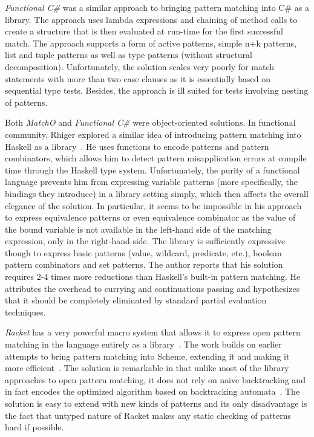 \emph{Functional C\#} was a similar approach to bringing pattern matching into 
C\# as a library\cite{FuncCSharp}. The approach uses lambda expressions and 
chaining of method calls to create a structure that is then evaluated at 
run-time for the first successful match. The approach supports a form of 
active patterns, simple n+k patterns, list and tuple patterns as well as type 
patterns (without structural decomposition). Unfortunately, the solution scales 
very poorly for match statements with more than two case clauses as it is 
essentially based on sequential type tests. Besides, the approach is ill suited 
for tests involving nesting of patterns.

Both \emph{MatchO} and \emph{Functional C\#} were object-oriented solutions. In 
functional community, Rhiger explored a similar idea of introducing pattern 
matching into Haskell as a library~\cite{Rhiger09}. He uses functions to encode 
patterns and pattern combinators, which allows him to detect pattern 
misapplication errors at compile time through the Haskell type system. 
Unfortunately, the purity of a functional language prevents him from expressing 
variable patterns (more specifically, the bindings they introduce) in a library 
setting simply, which then affects the overall elegance of the solution. In 
particular, it seems to be impossible in his approach to express equivalence 
patterns or even equivalence combinator as the value of the bound variable is 
not available in the left-hand side of the matching expression, only in the 
right-hand side. The library is sufficiently expressive though to express basic 
patterns (value, wildcard, predicate, etc.), boolean pattern combinators and set 
patterns. The author reports that his solution requires 2-4 times more 
reductions than Haskell's built-in pattern matching. He attributes the overhead 
to currying and continuations passing and hypothesizes that it should be completely 
eliminated by standard partial evaluation techniques.

\emph{Racket} has a very powerful macro system that allows it to express open pattern 
matching in the language entirely as a library~\cite{Tobin-Hochstadt_2010}. 
The work builds on earlier attempts to bring pattern matching into Scheme, 
extending it and making it more efficient~\cite{Wright95}. The solution is 
remarkable in that unlike most of the library approaches to open pattern matching, 
it does not rely on naive backtracking and in fact encodes the optimized 
algorithm based on backtracking automata~\cite{Augustsson85,OPM01}. The solution 
is easy to extend with new kinds of patterns and its only disadvantage is the 
fact that untyped nature of Racket makes any static checking of patterns hard if 
possible.

